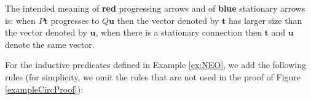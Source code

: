 The intended meaning of {\color{red} \bf red} progressing arrows and of {\color{blue} \bf blue} stationary arrows is: when $P\mathbf{t}$ progresses to $Q\mathbf{u}$ then the vector denoted by $\mathbf{t}$ has larger size than the vector denoted by $\mathbf{u}$, when there is a stationary connection then $\mathbf{t}$ and $\mathbf{u}$ denote the same vector.

\begin{example}
\label{example-NEO-sequent}
For the inductive predicates defined in Example \ref{ex:NEO}, we add the following rules (for simplicity, we omit the rules that are not used in the proof of Figure \ref{exampleCircProof}):    

\begin{center}
    \centering
    \begin{minipage}{0.3\textwidth}
        \centering
    \end{minipage}
    \hfill
    \begin{minipage}{0.3\textwidth}
        \centering
    \end{minipage}
    \hfill
    \begin{minipage}{0.3\textwidth}
        \centering
    \end{minipage}
    \hfill
    \\[1em]

    \begin{centering}
    \end{centering}

\end{center}

\end{example}

